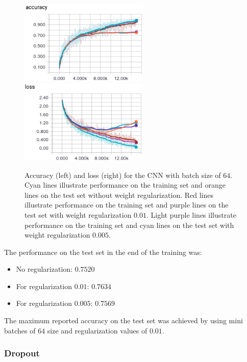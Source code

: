 \documentclass{article}
\begin{document}
\begin{figure}[h!]
\centering
\includegraphics[height=4.0cm]{acc-linear-64-reg.png}\
\includegraphics[height=4.0cm]{loss-linear-64-reg.png}
\caption{Accuracy (left) and loss (right) for the CNN with batch size of $64$. Cyan lines illustrate performance on the training set and orange lines on the test set without weight regularization. Red lines illustrate performance on the training set and purple lines on the test set with weight regularization $0.01$. Light purple lines illustrate performance on the training set and cyan lines on the test set with weight regularization $0.005$.}
\label{fig:5}
\end{figure}
The performance on the test set in the end of the training was:
\begin{itemize}
\item No regularization: $0.7520$
\item For regularization $0.01$: $\mathbf{0.7634}$
\item For regularization $0.005$: $0.7569$
\end{itemize}
The maximum reported accuracy on the test set was achieved by using mini batches of $64$ size and regularization values of $0.01$.


\subsubsection{Dropout}
\end{document}
